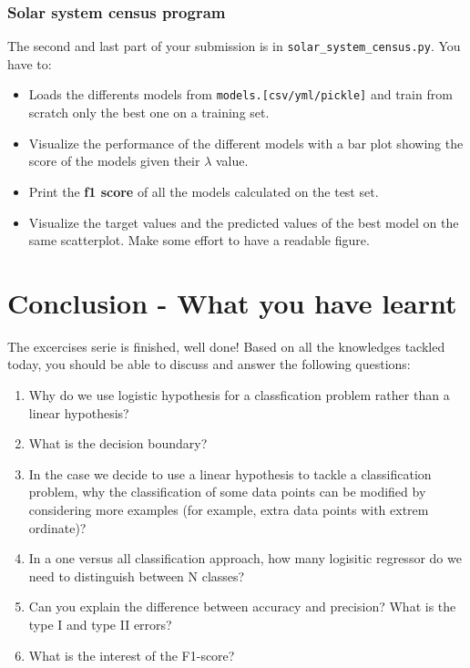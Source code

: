 \documentclass{42-en}
\begin{document}
\subsection*{Solar system census program}
The second and last part of your submission is in \texttt{solar\_system\_census.py}. You have to:
\begin{itemize}
  \item Loads the differents models from \texttt{models.[csv/yml/pickle]} and train from scratch only the best one on a training set.
  \item Visualize the performance of the different models with a bar plot showing the score of the models given their $\lambda$ value.
  \item Print the \textbf{f1 score} of all the models calculated on the test set.
  \item Visualize the target values and the predicted values of the best model on the same scatterplot. Make some effort to have a readable figure.
\end{itemize}



\newpage

\chapter{Conclusion - What you have learnt}

The excercises serie is finished, well done!
Based on all the knowledges tackled today, you should be able to discuss and answer the following questions:

\begin{enumerate}
  \item Why do we use logistic hypothesis for a classfication problem rather than a linear hypothesis?
  \item What is the decision boundary?
  \item In the case we decide to use a linear hypothesis to tackle a classification problem, why the classification of some data points can be modified by considering more examples (for example, extra data points with extrem ordinate)?
  \item In a one versus all classification approach, how many logisitic regressor do we need to distinguish between N classes?
  \item Can you explain the difference between accuracy and precision? What is the type I and type II errors?
  \item What is the interest of the F1-score?
\end{enumerate}
\end{document}
